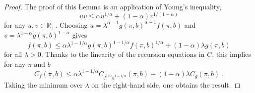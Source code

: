 \documentclass[aps,nofootinbib,groupaddress,superscriptaddress,reprint,amsmath,amssymb,graphicx,onecolumn,prx]{revtex4-2}
\begin{document}
\begin{proof}
The proof of this Lemma is an application of Young's inequality, 
\begin{equation}
    uv\leq\alpha u^{1/\alpha}+(1-\alpha)v^{1/(1-\alpha)}
\end{equation}
for any $u,v\in\mathbb{R}_+$. Choosing $u=\lambda^{\alpha-1}g(\pi,b)^{\alpha-1}f(\pi,b)$ and $v=\lambda^{1-\alpha}g(\pi,b)^{1-\alpha}$ gives
\begin{equation}
    f(\pi,b)\leq\alpha\lambda^{1-1/\alpha}g(\pi,b)^{1-1/\alpha}f(\pi,b)^{1/\alpha}+(1-\alpha)\lambda g(\pi,b)
\end{equation}
for all $\lambda>0$. Thanks to the linearity of the recursion equations in $C$, this implies for any $\pi$ and $b$
\begin{equation}
    C_f(\pi,b)\leq\alpha\lambda^{1-1/\alpha}C_{f^{1/\alpha}g^{1-1/\alpha}}(\pi,b)+(1-\alpha)\lambda C_g(\pi,b) \; .
\end{equation}
Taking the minimum over $\lambda$ on the right-hand side, one obtains the result.
\end{proof}
\end{document}
